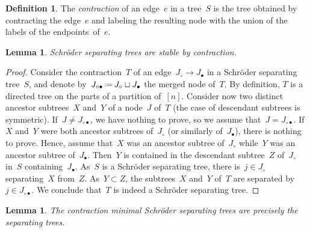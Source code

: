 \documentclass{amsart}
\newtheorem{lemma}[theorem]{Lemma}
\theoremstyle{definition}
\newtheorem{definition}[theorem]{Definition}
\newcommand{\eqdef}{\mbox{\,\raisebox{0.2ex}{\scriptsize\ensuremath{\mathrm:}}\ensuremath{=}\,}} %
\newcommand{\darkblue}{\color{darkblue}} %
\newcommand{\defn}[1]{\textsl{\darkblue #1}} %
\begin{document}
\begin{definition}
The \defn{contraction} of an edge~$e$ in a tree~$S$ is the tree obtained by contracting the edge~$e$ and labeling the resulting node with the union of the labels of the endpoints~of~$e$.
\end{definition}

\begin{lemma}
\label{lem:contractionSchroderSeparatingTree}
Schröder separating trees are stable by contraction.
\end{lemma}

\begin{proof}
Consider the contraction~$T$ of an edge~$J_\circ \to J_\bullet$ in a Schröder separating tree~$S$, and denote by~$J_{\circ\bullet} \eqdef J_\circ \sqcup J_\bullet$ the merged node of~$T$.
By definition, $T$ is a directed tree on the parts of a partition of~$[n]$.
Consider now two distinct ancestor subtrees~$X$ and~$Y$ of a node~$J$ of~$T$ (the case of descendant subtrees is symmetric).
If~$J \ne J_{\circ\bullet}$, we have nothing to prove, so we assume that~$J = J_{\circ\bullet}$.
If~$X$ and~$Y$ were both ancestor subtrees of~$J_\circ$ (or similarly of~$J_\bullet$), there is nothing to prove.
Hence, assume that~$X$ was an ancestor subtree of~$J_\circ$ while~$Y$ was an ancestor subtree of~$J_\bullet$.
Then~$Y$ is contained in the descendant subtree~$Z$ of~$J_\circ$ in~$S$ containing~$J_\bullet$.
As~$S$ is a Schröder separating tree, there is~$j \in J_\circ$ separating~$X$ from~$Z$.
As~$Y \subset Z$, the subtrees~$X$ and~$Y$ of~$T$ are separated by~$j \in J_{\circ\bullet}$.
We conclude that~$T$ is indeed a Schröder separating tree.
\end{proof}

\begin{lemma}
\label{lem:decontractionSchroderSeparatingTree}
The contraction minimal Schröder separating trees are precisely the separating trees.
\end{lemma}
\end{document}
